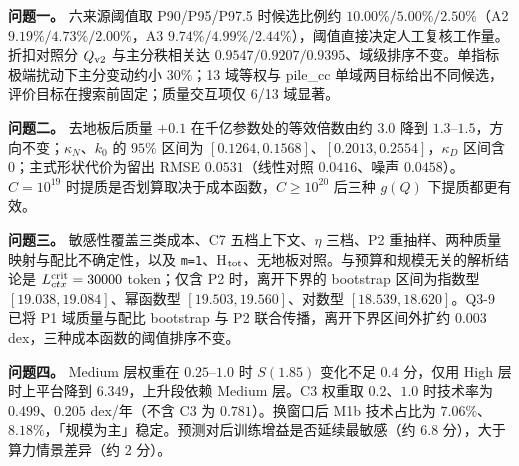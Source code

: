 \textbf{问题一。} 六来源阈值取 P90/P95/P97.5 时候选比例约 $10.00\%/5.00\%/2.50\%$（A2 $9.19\%/4.73\%/2.00\%$，A3 $9.74\%/4.99\%/2.44\%$），阈值直接决定人工复核工作量。折扣对照分 $Q_{\rm v2}$ 与主分秩相关达 $0.9547/0.9207/0.9395$、域级排序不变。单指标极端扰动下主分变动约小 $30\%$；13 域等权与 pile\_cc 单域两目标给出不同候选，评价目标在搜索前固定；质量交互项仅 6/13 域显著。

\textbf{问题二。} 去地板后质量 $+0.1$ 在千亿参数处的等效倍数由约 $3.0$ 降到 $1.3$–$1.5$，方向不变；$\kappa_N$、$k_0$ 的 $95\%$ 区间为 $[0.1264,0.1568]$、$[0.2013,0.2554]$，$\kappa_D$ 区间含 0；主式形状代价为留出 RMSE $0.0531$（线性对照 $0.0416$、噪声 $0.0458$）。$C=10^{19}$ 时提质是否划算取决于成本函数，$C\ge10^{20}$ 后三种 $g(Q)$ 下提质都更有效。

\textbf{问题三。} 敏感性覆盖三类成本、C7 五档上下文、$\eta$ 三档、P2 重抽样、两种质量映射与配比不确定性，以及 \texttt{m=1}、H$_{\rm tot}$、无地板对照。与预算和规模无关的解析结论是 $L_{ctx}^{\rm crit}=30000$ token；仅含 P2 时，离开下界的 bootstrap 区间为指数型 $[19.038,19.084]$、幂函数型 $[19.503,19.560]$、对数型 $[18.539,18.620]$。Q3-9 已将 P1 域质量与配比 bootstrap 与 P2 联合传播，离开下界区间外扩约 $0.003$ dex，三种成本函数的阈值排序不变。

\textbf{问题四。} Medium 层权重在 $0.25$–$1.0$ 时 $S(1.85)$ 变化不足 $0.4$ 分，仅用 High 层时上平台降到 $6.349$，上升段依赖 Medium 层。C3 权重取 $0.2$、$1.0$ 时技术率为 $0.499$、$0.205$ dex/年（不含 C3 为 $0.781$）。换窗口后 M1b 技术占比为 $7.06\%$、$8.18\%$，「规模为主」稳定。预测对后训练增益是否延续最敏感（约 $6.8$ 分），大于算力情景差异（约 $2$ 分）。
